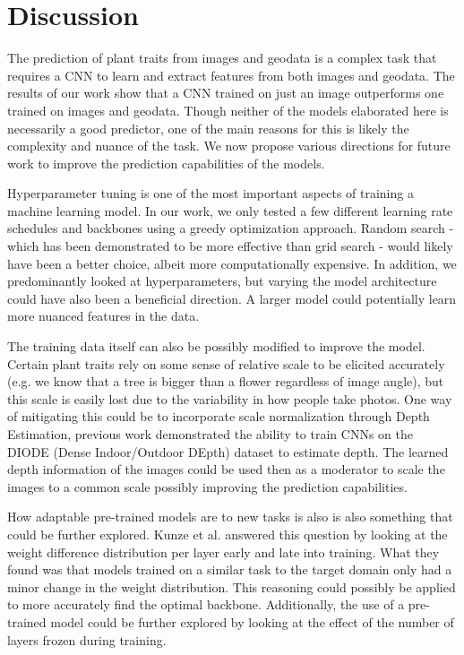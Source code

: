 \documentclass[12pt,a4paper,oneside]{article}
\begin{document}
\section{Discussion}

The prediction of plant traits from images and geodata is a complex task that requires a CNN to learn and extract features from both images and geodata. The results of our work show that a CNN trained on just an image outperforms one trained on images and geodata. Though neither of the models elaborated here is necessarily a good predictor, one of the main reasons for this is likely the complexity and nuance of the task. We now propose various directions for future work to improve the prediction capabilities of the models.

Hyperparameter tuning is one of the most important aspects of training a machine learning model. In our work, we only tested a few different learning rate schedules and backbones using a greedy optimization approach. Random search - which has been demonstrated to be more effective than grid search \cite{JMLR:v13:bergstra12a} - would likely have been a better choice, albeit more computationally expensive. In addition, we predominantly looked at hyperparameters, but varying the model architecture could have also been a beneficial direction. A larger model could potentially learn more nuanced features in the data. 

The training data itself can also be possibly modified to improve the model. Certain plant traits rely on some sense of relative scale to be elicited accurately (e.g. we know that a tree is bigger than a flower regardless of image angle), but this scale is easily lost due to the variability in how people take photos. One way of mitigating this could be to incorporate scale normalization through Depth Estimation, previous work \cite{Ummenhofer_2017} demonstrated the ability to train CNNs on the DIODE (Dense Indoor/Outdoor DEpth) \cite{vasiljevic2019diode} dataset to estimate depth. The learned depth information of the images could be used then as a moderator to scale the images to a common scale possibly improving the prediction capabilities.

How adaptable pre-trained models are to new tasks is also is also something that could be further explored. Kunze et al. \cite{kunze2017transfer} answered this question by looking at the weight difference distribution per layer early and late into training. What they found was that models trained on a similar task to the target domain only had a minor change in the weight distribution. This reasoning could possibly be applied to more accurately find the optimal backbone. Additionally, the use of a pre-trained model could be further explored by looking at the effect of the number of layers frozen during training. 
\end{document}
